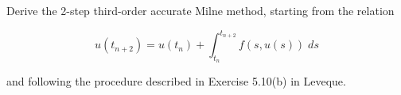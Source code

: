 Derive the 2-step third-order accurate Milne method, starting from the relation

$$
u(t_{n+2}) = u(t_n) + \int_{t_n}^{t_{n+2}}{f(s, u(s))\; ds}
$$

and following the procedure described in Exercise 5.10(b) in Leveque.

\begin{solution}\ \\\\
    \ \\
    \newpage
    \hfill\vfill
\end{solution}